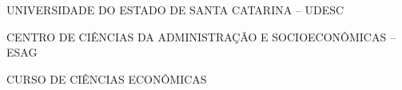 

\renewcommand{\imprimircapa}{%
	\begin{capa}%
		\center

		{\fontseries{b}\selectfont\MakeTextUppercase{UNIVERSIDADE DO ESTADO DE SANTA CATARINA -- UDESC}}

		{\fontseries{b}\selectfont\MakeTextUppercase{CENTRO DE CIÊNCIAS DA ADMINISTRAÇÃO E SOCIOECONÔMICAS -- ESAG  }}

		{\fontseries{b}\selectfont\MakeTextUppercase{CURSO DE CIÊNCIAS ECONÔMICAS}}

		\vfill

		{\fontseries{b}\selectfont\MakeTextUppercase{\normalsize\imprimirautor}}

		\vfill
		\begin{center}
			{\fontseries{b}\selectfont\MakeTextUppercase{\imprimirtitulo}}
		\end{center}
		\vfill

		\vfill

		{\fontseries{b}\selectfont\MakeTextUppercase{\imprimirlocal}}
		\par
		{\selectfont \imprimirdata}
		\vspace*{1cm}
	\end{capa}
}



\imprimircapa				%

